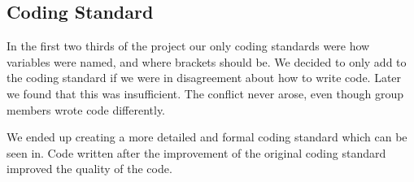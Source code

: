 \subsection{Coding Standard}
In the first two thirds of the project our only coding standards were how variables were named, and where brackets should be. We decided to only add to the coding standard if we were in disagreement about how to write code. Later we found that this was insufficient. The conflict never arose, even though group members wrote code differently.

We ended up creating a more detailed and formal coding standard which can be seen in. Code written after the improvement of the original coding standard improved the quality of the code.

